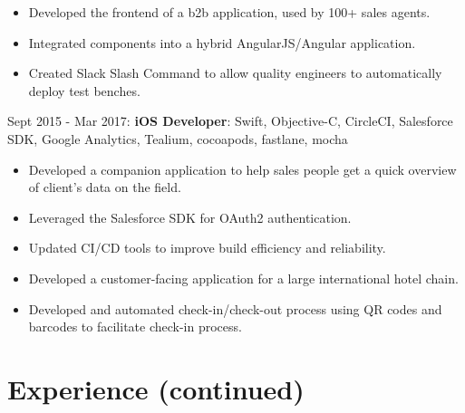 \documentclass[letterpaper]{template} %
\begin{document}
\begin{twenty}
        {\begin{itemize}
            \item Developed the frontend of a b2b application, used by 100+ sales agents.
            \item Integrated components into a hybrid AngularJS/Angular application.
            \item Created Slack Slash Command to allow quality engineers to automatically deploy test benches.
        \end{itemize}}
    \twentyitem
    	{}
		{}
        {}
        {}
        {Sept 2015 - Mar 2017: \textbf{iOS Developer}: Swift, Objective-C, CircleCI, Salesforce SDK, Google Analytics, Tealium, cocoapods, fastlane, mocha}
        {\begin{itemize}
            \item Developed a companion application to help sales people get a quick overview of client's data on the field.
            \item Leveraged the Salesforce SDK for OAuth2 authentication.
            \item Updated CI/CD tools to improve build efficiency and reliability.
            \item Developed a customer-facing application for a large international hotel chain.
            \item Developed and automated check-in/check-out process using QR codes and barcodes to facilitate check-in process.
        \end{itemize}}
\end{twenty}

\newpage
\sidebaronly

\section{Experience (continued)}
\end{document}
